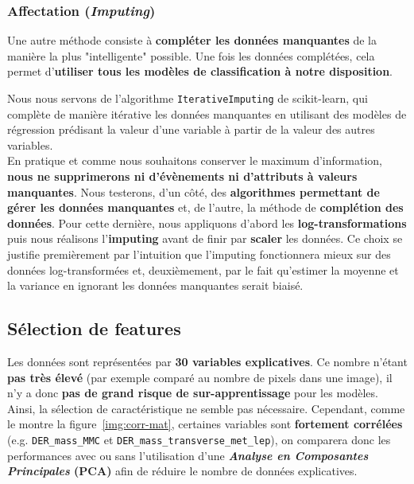 \documentclass[12pt]{article}
\newcommand{\figref}[1]{figure~\ref{#1}}
\begin{document}
\subsubsection{Affectation (\emph{Imputing})}

Une autre méthode consiste à \textbf{compléter les données manquantes} de la
manière la plus "intelligente" possible. Une fois les données complétées, cela
permet d’\textbf{utiliser tous les modèles de classification à notre
disposition}. 

Nous nous servons de l’algorithme \texttt{IterativeImputing} de
scikit-learn, qui complète de manière itérative les données manquantes en
utilisant des modèles de régression prédisant la valeur d’une variable à partir
de la valeur des autres variables. \\

En pratique et comme nous souhaitons conserver le maximum d'information,
\textbf{nous ne supprimerons ni d'évènements ni d'attributs à valeurs
manquantes}. Nous testerons, d'un côté, des \textbf{algorithmes permettant de
gérer les données manquantes} et, de l'autre, la méthode de \textbf{complétion
des données}. Pour cette dernière, nous appliquons d'abord les
\textbf{log-transformations} puis nous réalisons l’\textbf{imputing} avant de
finir par \textbf{scaler} les données. Ce choix se justifie premièrement par
l’intuition que l’imputing fonctionnera mieux sur des données log-transformées
et, deuxièmement, par le fait qu’estimer la moyenne et la variance en ignorant
les données manquantes serait biaisé.

\subsection{Sélection de features}

Les données sont représentées par \textbf{30 variables explicatives}. Ce nombre
n’étant \textbf{pas très élevé} (par exemple comparé au nombre de pixels dans
une image), il n’y a donc \textbf{pas de grand risque de sur-apprentissage} pour
les modèles. Ainsi, la sélection de caractéristique ne semble pas nécessaire.
Cependant, comme le montre la \figref{img:corr-mat}, certaines variables sont
\textbf{fortement corrélées} (e.g. \texttt{DER\_mass\_MMC} et
\texttt{DER\_mass\_transverse\_met\_lep}), on comparera donc les performances
avec ou sans l’utilisation d’une \textbf{\emph{Analyse en Composantes
Principales} (PCA)} afin de réduire le nombre de données explicatives.
\end{document}
